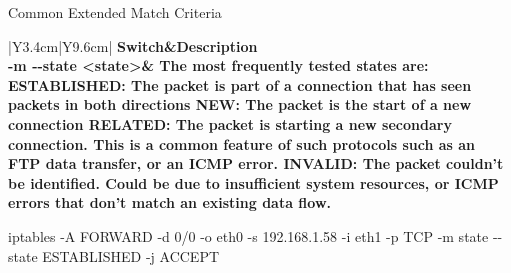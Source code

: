 \begin{frame}{Common Extended Match Criteria}
\centering\fontsize{11}{13.3}\selectfont
\renewcommand{\arraystretch}{1.12}
\begin{tabular}{|Y{3.4cm}|Y{9.6cm}|}\hline
{}\color{white}\bfseries Switch&\color{white}\bfseries Description\\\hline
\textcolor{CommandGreen}{\ttfamily\bfseries -m -{}-state <state>}&
The most frequently tested states are:\newline
\textcolor{WarningColor}{\bfseries ESTABLISHED}: The packet is part of a connection that has seen packets in both directions\newline
\textcolor{WarningColor}{\bfseries NEW}: The packet is the start of a new connection\newline
\textcolor{WarningColor}{\bfseries RELATED}: The packet is starting a new secondary connection. This is a common feature of such protocols such as an FTP data transfer, or an ICMP error.\newline
\textcolor{WarningColor}{\bfseries INVALID}: The packet couldn't be identified. Could be due to insufficient system resources, or ICMP errors that don't match an existing data flow.\\\hline
\end{tabular}
\vspace{0.25cm}
{\color{WarningColor}\ttfamily\fontsize{12}{15}\selectfont iptables -A FORWARD -d 0/0 -o eth0 -s 192.168.1.58 -i eth1 -p TCP -m state -{}-state ESTABLISHED -j ACCEPT\par}
\end{frame}
